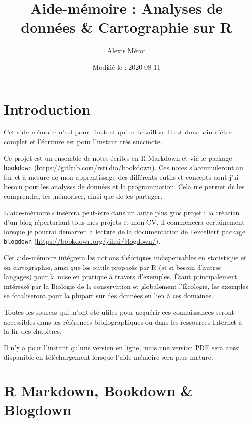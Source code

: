 \documentclass[
  french,
]{book}
\title{Aide-mémoire : Analyses de données \& Cartographie sur R}
\author{Alexis Mérot}
\date{Modifié le : 2020-08-11}
\newenvironment{infobox}[1]
  {
  \begin{itemize}
  \renewcommand{\labelitemi}{
    \raisebox{-.7\height}[0pt][0pt]{
      {\setkeys{Gin}{width=3em,keepaspectratio}
        \texttt{[image: images/\#1]}}
    }
  }
  \setlength{\fboxsep}{1em}
  \begin{blackbox}
  \item
  }
  {
  \end{blackbox}
  \end{itemize}
  }
\begin{document}
\maketitle

{
\setcounter{tocdepth}{1}
\tableofcontents
}
\hypertarget{introduction}{%
\chapter*{Introduction}\label{introduction}}

\begin{infobox}{caution}

Cet aide-mémoire n'est pour l'instant qu'un brouillon. Il est donc loin d'être complet et l'écriture est pour l'instant très succincte.

\end{infobox}

Ce projet est un ensemble de notes écrites en R Markdown \citep{R-rmarkdown} et via
le package \texttt{bookdown} (\url{https://github.com/rstudio/bookdown}). Ces notes
s'accumuleront au fur et à mesure de mon apprentissage des différents outils et
concepts dont j'ai besoin pour les analyses de données et la programmation. Cela
me permet de les comprendre, les mémoriser, ainsi que de les partager.

L'aide-mémoire s'insérera peut-être dans un autre plus gros projet : la création
d'un blog répertoriant tous mes projets et mon CV. Il commencera certainement
lorsque je pourrai démarrer la lecture de la documentation de l'excellent
package \texttt{blogdown} (\url{https://bookdown.org/yihui/blogdown/}).

Cet aide-mémoire intégrera les notions théoriques indispensables en statistique
et en cartographie, ainsi que les outils proposés par R (et si besoin d'autres
langages) pour la mise en pratique à travers d'exemples. Étant principalement
intéressé par la Biologie de la conservation et globalement l'Écologie, les
exemples se focaliseront pour la plupart sur des données en lien à ces domaines.

Toutes les sources qui m'ont été utiles pour acquérir ces connaissances seront
accessibles dans les références bibliographiques ou dans les ressources Internet
à la fin des chapitres.

Il n'y a pour l'instant qu'une version en ligne, mais une version PDF sera aussi disponible en téléchargement lorsque l'aide-mémoire sera plus mature.

\hypertarget{rmarkdown}{%
\chapter{R Markdown, Bookdown \& Blogdown}\label{rmarkdown}}
\end{document}
